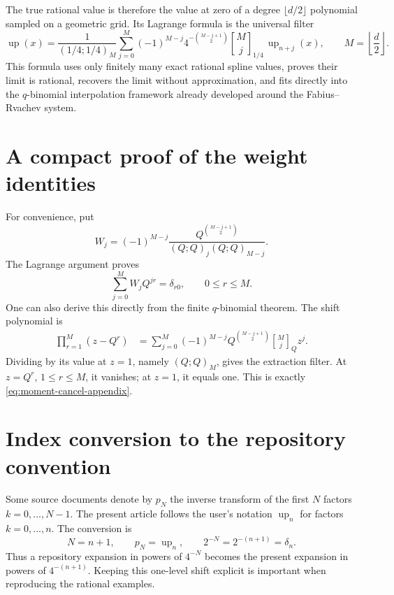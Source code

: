 \documentclass[11pt]{article}
\newcommand{\upf}{\operatorname{up}}
\newcommand{\qbinom}[3]{\genfrac{[}{]}{0pt}{}{#1}{#2}_{#3}}
\begin{document}
The true rational value is therefore the value at zero of a degree
\(\lfloor d/2\rfloor\) polynomial sampled on a geometric grid.  Its Lagrange
formula is the universal filter
\[
 \upf(x)=\frac{1}{(1/4;1/4)_M}
 \sum_{j=0}^{M}(-1)^{M-j}4^{-\binom{M-j+1}{2}}
 \qbinom{M}{j}{1/4}\,\upf_{n+j}(x),
 \qquad M=\left\lfloor\frac d2\right\rfloor.
\]
This formula uses only finitely many exact rational spline values, proves their
limit is rational, recovers the limit without approximation, and fits directly
into the \(q\)-binomial interpolation framework already developed around the
Fabius--Rvachev system.

\appendix

\section{A compact proof of the weight identities}

For convenience, put
\[
 W_j=(-1)^{M-j}
 \frac{Q^{\binom{M-j+1}{2}}}{(Q;Q)_j(Q;Q)_{M-j}}.
\]
The Lagrange argument proves
\begin{equation}\label{eq:moment-cancel-appendix}
 \sum_{j=0}^{M}W_jQ^{jr}=\delta_{r0},
 \qquad 0\le r\le M.
\end{equation}
One can also derive this directly from the finite \(q\)-binomial theorem.  The
shift polynomial is
\begin{align*}
 \prod_{r=1}^{M}(z-Q^r)
 &=\sum_{j=0}^{M}(-1)^{M-j}
   Q^{\binom{M-j+1}{2}}
   \qbinom{M}{j}{Q}z^j.
\end{align*}
Dividing by its value at \(z=1\), namely \((Q;Q)_M\), gives the extraction
filter.  At \(z=Q^r\), \(1\le r\le M\), it vanishes; at \(z=1\), it equals one.
This is exactly \cref{eq:moment-cancel-appendix}.

\section{Index conversion to the repository convention}

Some source documents denote by \(p_N\) the inverse transform of the first
\(N\) factors \(k=0,\ldots,N-1\).  The present article follows the user's
notation \(\upf_n\) for factors \(k=0,\ldots,n\).  The conversion is
\[
 N=n+1,
 \qquad
 p_N=\upf_n,
 \qquad
 2^{-N}=2^{-(n+1)}=\delta_n.
\]
Thus a repository expansion in powers of \(4^{-N}\) becomes the present
expansion in powers of \(4^{-(n+1)}\).  Keeping this one-level shift explicit is
important when reproducing the rational examples.
\end{document}
